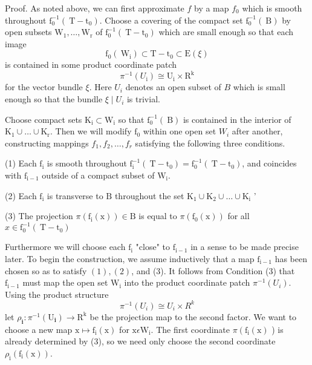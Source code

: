 \documentclass[10pt]{article}
\begin{document}
Proof. As noted above, we can first approximate $f$ by a map $f_{0}$ which is smooth throughout $\mathrm{f}_{0}^{-1}\left(\mathrm{~T}-\mathrm{t}_{0}\right)$. Choose a covering of the compact set $\mathrm{f}_{0}^{-1}(\mathrm{~B})$ by open subsets $\mathrm{W}_{1}, \ldots, \mathrm{W}_{\mathrm{r}}$ of $\mathrm{f}_{0}^{-1}\left(\mathrm{~T}-\mathrm{t}_{0}\right)$ which are small enough so that each image
$$
\mathrm{f}_{0}\left(\mathrm{~W}_{\mathrm{i}}\right) \subset \mathrm{T}-\mathrm{t}_{0} \subset \mathrm{E}(\xi)
$$
is contained in some product coordinate patch
$$
\pi^{-1}\left(U_{\mathrm{i}}\right) \cong \mathrm{U}_{\mathrm{i}} \times \mathrm{R}^{\mathrm{k}}
$$
for the vector bundle $\xi$. Here $U_{i}$ denotes an open subset of $B$ which is small enough so that the bundle $\xi \mid U_{i}$ is trivial.

Choose compact sets $\mathrm{K}_{\mathrm{i}} \subset \mathrm{W}_{\mathrm{i}}$ so that $\mathrm{f}_{0}^{-1}(\mathrm{~B})$ is contained in the interior of $\mathrm{K}_{1} \cup \ldots \cup \mathrm{K}_{\mathrm{r}}$. Then we will modify $\mathrm{f}_{0}$ within one open set $W_{i}$ after another, constructing mappings $f_{1}, f_{2}, \ldots, f_{r}$ satisfying the following three conditions.

(1) Each $\mathrm{f}_{\mathrm{i}}$ is smooth throughout $\mathrm{f}_{\mathrm{i}}^{-1}\left(\mathrm{~T}-\mathrm{t}_{0}\right)=\mathrm{f}_{0}^{-1}\left(\mathrm{~T}-\mathrm{t}_{0}\right)$, and coincides with $\mathrm{f}_{\mathrm{i}-1}$ outside of a compact subset of $\mathrm{W}_{\mathrm{i}}$.

(2) Each $\mathrm{f}_{\mathrm{i}}$ is transverse to $\mathrm{B}$ throughout the set $\mathrm{K}_{1} \cup \mathrm{K}_{2} \cup \ldots \cup \mathrm{K}_{\mathrm{i}}$ '

(3) The projection $\pi\left(\mathrm{f}_{\mathrm{i}}(\mathrm{x})\right) \in \mathrm{B}$ is equal to $\pi\left(\mathrm{f}_{0}(\mathrm{x})\right)$ for all $x \in \mathrm{f}_{0}^{-1}\left(\mathrm{~T}-\mathrm{t}_{0}\right)$

Furthermore we will choose each $\mathrm{f}_{\mathrm{i}}$ "close" to $\mathrm{f}_{\mathrm{i}-1}$ in a sense to be made precise later. To begin the construction, we assume inductively that a map $\mathrm{f}_{\mathrm{i}-1}$ has been chosen so as to satisfy $(1),(2)$, and (3). It follows from Condition (3) that $\mathrm{f}_{\mathrm{i}-1}$ must map the open set $\mathrm{W}_{\mathrm{i}}$ into the product coordinate patch $\pi^{-1}\left(U_{i}\right)$. Using the product structure
$$
\pi^{-1}\left(U_{i}\right) \cong U_{i} \times R^{k}
$$
let $\rho_{\mathbf{i}}: \pi^{-1}\left(\mathrm{U}_{\mathbf{i}}\right) \rightarrow \mathrm{R}^{\mathrm{k}}$ be the projection map to the second factor. We want to choose a new map $\mathrm{x} \mapsto \mathrm{f}_{\mathrm{i}}(\mathrm{x})$ for $\mathrm{x} \epsilon \mathrm{W}_{\mathrm{i}}$. The first coordinate $\pi\left(\mathrm{f}_{\mathrm{i}}(\mathrm{x})\right.$ ) is already determined by (3), so we need only choose the second coordinate $\rho_{\mathrm{i}}\left(\mathrm{f}_{\mathrm{i}}(\mathrm{x})\right)$.
\end{document}
